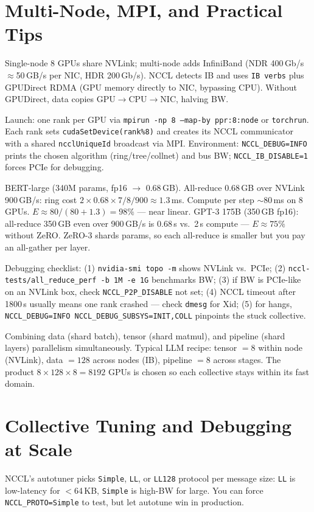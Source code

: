 \section{Multi-Node, MPI, and Practical Tips}
Single-node 8 GPUs share NVLink; multi-node adds InfiniBand (NDR 400\,Gb/s $\approx$50\,GB/s per NIC, HDR 200\,Gb/s). NCCL detects IB and uses \texttt{IB verbs} plus GPUDirect RDMA (GPU memory directly to NIC, bypassing CPU). Without GPUDirect, data copies GPU$\to$CPU$\to$NIC, halving BW.

Launch: one rank per GPU via \texttt{mpirun -np 8 --map-by ppr:8:node} or \texttt{torchrun}. Each rank sets \texttt{cudaSetDevice(rank\%8)} and creates its NCCL communicator with a shared \texttt{ncclUniqueId} broadcast via MPI. Environment: \texttt{NCCL\_DEBUG=INFO} prints the chosen algorithm (ring/tree/collnet) and bus BW; \texttt{NCCL\_IB\_DISABLE=1} forces PCIe for debugging.

\begin{example}
BERT-large (340M params, fp16 $\to$ 0.68\,GB). All-reduce 0.68\,GB over NVLink 900\,GB/s: ring cost $2{\times}0.68{\times}7/8 /900 \approx 1.3$\,ms. Compute per step $\sim$80\,ms on 8 GPUs. $E\approx 80/(80+1.3)=98\%$ --- near linear. GPT-3 175B (350\,GB fp16): all-reduce 350\,GB even over 900\,GB/s is 0.68\,s vs.\ 2\,s compute --- $E\approx75\%$ without ZeRO. ZeRO-3 shards params, so each all-reduce is smaller but you pay an all-gather per layer.
\end{example}

Debugging checklist: (1) \texttt{nvidia-smi topo -m} shows NVLink vs.\ PCIe; (2) \texttt{nccl-tests/all\_reduce\_perf -b 1M -e 1G} benchmarks BW; (3) if BW is PCIe-like on an NVLink box, check \texttt{NCCL\_P2P\_DISABLE} not set; (4) NCCL timeout after 1800\,s usually means one rank crashed --- check \texttt{dmesg} for Xid; (5) for hangs, \texttt{NCCL\_DEBUG=INFO NCCL\_DEBUG\_SUBSYS=INIT,COLL} pinpoints the stuck collective.

\begin{definition}[3-D parallelism]
Combining data (shard batch), tensor (shard matmul), and pipeline (shard layers) parallelism simultaneously. Typical LLM recipe: tensor $=8$ within node (NVLink), data $=128$ across nodes (IB), pipeline $=8$ across stages. The product $8{\times}128{\times}8=8192$ GPUs is chosen so each collective stays within its fast domain.
\end{definition}


\section{Collective Tuning and Debugging at Scale}
NCCL's autotuner picks \texttt{Simple}, \texttt{LL}, or \texttt{LL128} protocol per message size: \texttt{LL} is low-latency for $<$64\,KB, \texttt{Simple} is high-BW for large. You can force \texttt{NCCL\_PROTO=Simple} to test, but let autotune win in production.

